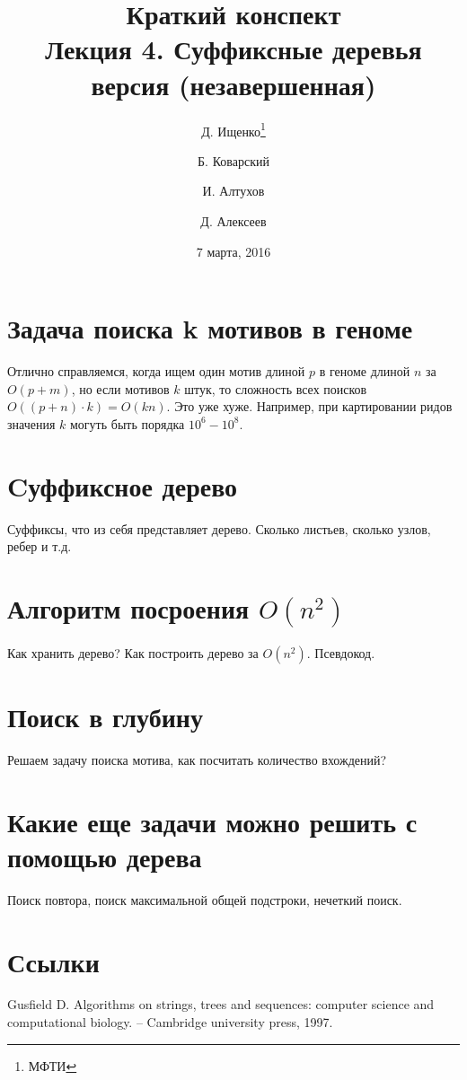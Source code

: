 \documentclass[letterpaper, 11pt]{article}
\title{\large{Краткий конспект}\\
\LARGE{Лекция 4. Суффиксные деревья}\\
\normalsize версия \versionnumber (\textcolor{NavyBlue}{незавершенная})}
\date{7 марта, 2016}
\author{Д. Ищенко\thanks{МФТИ} \and Б. Коварский\footnotemark[1]
\and И. Алтухов\footnotemark[1] \and Д. Алексеев\footnotemark[1]}
\begin{document}
\maketitle
\thispagestyle{empty}
\clearpage

\section{Задача поиска k мотивов в геноме}
\par
Отлично справляемся, когда ищем один мотив длиной $p$ в геноме длиной $n$ за $O(p + m)$, но если мотивов $k$ штук, то сложность всех поисков $O((p + n) \cdot k) = O(kn)$. Это уже хуже. Например, при картировании ридов значения $k$ могуть быть порядка $10^6 - 10^8$.
\section{Cуффиксное дерево}
\par
Суффиксы, что из себя представляет дерево. Сколько листьев, сколько узлов, ребер и т.д.
\section{Алгоритм посроения $O(n^2)$}
\par
Как хранить дерево? Как построить дерево за $O(n^2)$. Псевдокод.
\section{Поиск в глубину}
\par
Решаем задачу поиска мотива, как посчитать количество вхождений?
\section{Какие еще задачи можно решить с помощью дерева}
\par
Поиск повтора, поиск максимальной общей подстроки, нечеткий поиск.

\section{Ссылки}

\begingroup
\renewcommand{\section}[2]{}%
\begin{thebibliography}{7}
Gusfield D. Algorithms on strings, trees and sequences: computer science and computational biology. – Cambridge university press, 1997.


\end{thebibliography}
\endgroup
\end{document}
